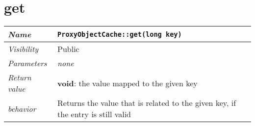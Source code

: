\section{get}
\begin{longtable}{p{3cm} @{\hskip 1cm} p{12cm}}
  \hline
  \textit{Name} & \texttt{ProxyObjectCache::get(long key)} \\
  \hline
  \textit{Visibility} & Public \\
  \hline
  \textit{Parameters} & \textit{none} \\
  \hline
  \textit{Return value} & \textbf{void}: the value mapped to the given key \\
  \hline
  \textit{behavior} & Returns the value that is related to the given key, if the entry is still valid \\
  \hline
\end{longtable}
